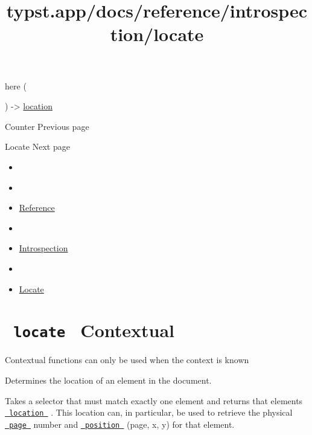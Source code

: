 { here } (

) -\textgreater{}
\href{/docs/reference/introspection/location/}{location}

\href{/docs/reference/introspection/counter/}{\pandocbounded{}}

{ Counter } { Previous page }

\href{/docs/reference/introspection/locate/}{\pandocbounded{}}

{ Locate } { Next page }


\title{typst.app/docs/reference/introspection/locate}

\begin{itemize}
\tightlist
\item
  \href{/docs}{}
\item
  
\item
  \href{/docs/reference/}{Reference}
\item
  
\item
  \href{/docs/reference/introspection/}{Introspection}
\item
  
\item
  \href{/docs/reference/introspection/locate/}{Locate}
\end{itemize}

\section{\texorpdfstring{\texttt{\ locate\ } {{ Contextual
}}}{ locate   Contextual }}\label{summary}

\label{contextual-tooltip}
Contextual functions can only be used when the context is known

Determines the location of an element in the document.

Takes a selector that must match exactly one element and returns that
element\textquotesingle s
\href{/docs/reference/introspection/location/}{\texttt{\ location\ }} .
This location can, in particular, be used to retrieve the physical
\href{/docs/reference/introspection/location/\#definitions-page}{\texttt{\ page\ }}
number and
\href{/docs/reference/introspection/location/\#definitions-position}{\texttt{\ position\ }}
(page, x, y) for that element.

